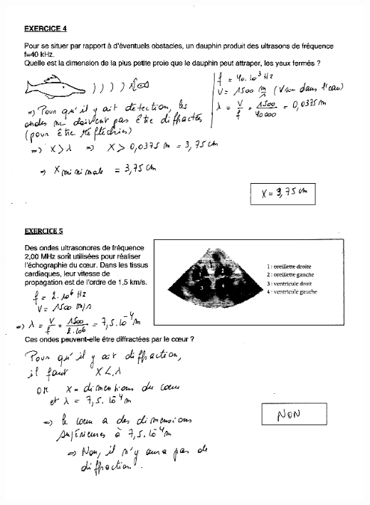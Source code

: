 {{{{{{{{{{\includegraphics[width=18.503cm,height=25.476cm]{Pictures/10000001000002710000035C11CB153182C339CB.png}

}}}}}}}}}}
